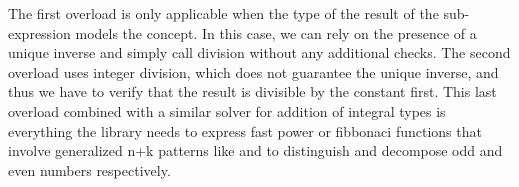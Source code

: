 \noindent
The first overload is only applicable when the type of the result of the 
sub-expression models the  concept. In this case, we can rely on the 
presence of a unique inverse and simply call division without any additional 
checks. The second overload uses integer division, which does not guarantee the 
unique inverse, and thus we have to verify that the result is divisible by the 
constant first. This last overload combined with a similar solver for addition 
of integral types is everything the library needs to express fast power or 
fibbonaci functions that involve generalized n+k patterns like  and 
 to distinguish and decompose odd and even numbers respectively.

%
%


